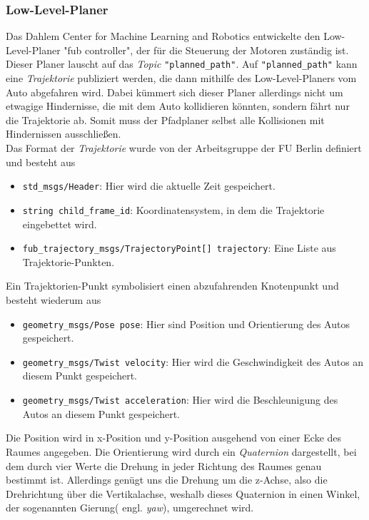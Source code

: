 \subsubsection{Low-Level-Planer}
Das Dahlem Center for Machine Learning and Robotics entwickelte den Low-Level-Planer "fub controller", der für die Steuerung der Motoren zuständig ist.
Dieser Planer lauscht auf das \textit{Topic} \verb|"planned_path"|. Auf \verb|"planned_path"| kann eine \textit{Trajektorie} publiziert werden, die dann mithilfe des Low-Level-Planers vom Auto abgefahren wird. Dabei kümmert sich dieser Planer allerdings nicht um etwagige Hindernisse, die mit dem Auto kollidieren könnten, sondern fährt nur die Trajektorie ab. Somit muss der Pfadplaner selbst alle Kollisionen mit Hindernissen ausschließen. \\
Das Format der \textit{Trajektorie} wurde von der Arbeitsgruppe der FU Berlin definiert und besteht aus
\begin{itemize}
\item \verb|std_msgs/Header|: Hier wird die aktuelle Zeit gespeichert.
\item \verb|string child_frame_id|: Koordinatensystem, in dem die Trajektorie eingebettet wird.
\item \verb|fub_trajectory_msgs/TrajectoryPoint[] trajectory|: Eine Liste aus Trajektorie-Punkten.
\end{itemize}
Ein Trajektorien-Punkt symbolisiert einen abzufahrenden Knotenpunkt und besteht wiederum aus
\begin{itemize}
\item \verb|geometry_msgs/Pose pose|: Hier sind Position und Orientierung des Autos gespeichert.
\item \verb|geometry_msgs/Twist velocity|: Hier wird die Geschwindigkeit des Autos an diesem Punkt gespeichert.
\item \verb|geometry_msgs/Twist acceleration|: Hier wird die Beschleunigung des Autos an diesem Punkt gespeichert.
\end{itemize}
Die Position wird in x-Position und y-Position ausgehend von einer Ecke des Raumes angegeben. Die Orientierung wird durch ein \textit{Quaternion} dargestellt, bei dem durch vier Werte die Drehung in jeder Richtung des Raumes genau bestimmt ist. Allerdings genügt uns die Drehung um die z-Achse, also die Drehrichtung über die Vertikalachse, weshalb dieses Quaternion in einen Winkel, der sogenannten Gierung( engl. \textit{yaw}), umgerechnet wird.
\\

